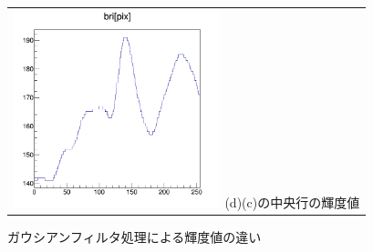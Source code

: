 \documentclass[12pt,a4paper]{jarticle}
\begin{document}
\begin{figure}[htbp]
\begin{tabular}{c}
        \begin{minipage}{0.5\hsize}
          \centering
              \includegraphics[clip, width=60mm]{gau2_hist.png}
              \hspace{1.6cm} (d)(c)の中央行の輝度値
        \end{minipage}
    
      \end{tabular}
      \caption{ガウシアンフィルタ処理による輝度値の違い\label{fig:do_gau_beforeandafter}}
\end{figure}
\end{document}
